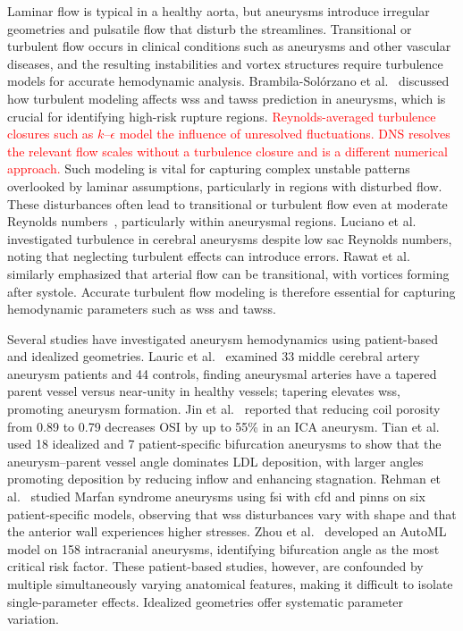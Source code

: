 \documentclass[12pt,a4paper]{article}
\newcommand{\cfdrevision}[1]{\textcolor{red}{#1}}
\newcommand{\CFD}{\ac{cfd}\xspace}
\newcommand{\FSI}{\ac{fsi}\xspace}
\newcommand{\PINNs}{\acp{pinn}\xspace}
\newcommand{\WSS}{\ac{wss}\xspace}
\newcommand{\TAWSS}{\ac{tawss}\xspace}
\newcommand{\OSI}{\ac{OSI}\xspace}
\newcommand{\ICA}{\ac{ICA}\xspace}
\newcommand{\DNS}{\ac{DNS}\xspace}
\newcommand{\LDL}{\ac{LDL}\xspace}
\theoremstyle{definition}
\numberwithin{equation}{section}
\begin{document}
Laminar flow is typical in a healthy aorta, but aneurysms introduce irregular geometries and pulsatile flow that disturb the streamlines. Transitional or turbulent flow occurs in clinical conditions such as aneurysms and other vascular diseases, and the resulting instabilities and vortex structures require turbulence models for accurate hemodynamic analysis. Brambila-Solórzano et al.~\cite{brambila2023influence} discussed how turbulent modeling affects \WSS and \TAWSS prediction in aneurysms, which is crucial for identifying high-risk rupture regions. \cfdrevision{Reynolds-averaged turbulence closures such as $k$--$\epsilon$ model the influence of unresolved fluctuations. \DNS resolves the relevant flow scales without a turbulence closure and is a different numerical approach.} Such modeling is vital for capturing complex unstable patterns overlooked by laminar assumptions, particularly in regions with disturbed flow. These disturbances often lead to transitional or turbulent flow even at moderate Reynolds numbers~\cite{evju2015assumption}, particularly within aneurysmal regions. Luciano et al.~\cite{luciano2024turbulent} investigated turbulence in cerebral aneurysms despite low sac Reynolds numbers, noting that neglecting turbulent effects can introduce errors. Rawat et al.~\cite{rawat2019numerical} similarly emphasized that arterial flow can be transitional, with vortices forming after systole. Accurate turbulent flow modeling is therefore essential for capturing hemodynamic parameters such as \WSS and \TAWSS.

Several studies have investigated aneurysm hemodynamics using patient-based and idealized geometries. Lauric et al.~\cite{lauric2019proximal} examined 33 middle cerebral artery aneurysm patients and 44 controls, finding aneurysmal arteries have a tapered parent vessel versus near-unity in healthy vessels; tapering elevates \WSS, promoting aneurysm formation. Jin et al.~\cite{jin2023cfd} reported that reducing coil porosity from 0.89 to 0.79 decreases \OSI by up to 55\% in an \ICA aneurysm. Tian et al.~\cite{tian2023influence} used 18 idealized and 7 patient-specific bifurcation aneurysms to show that the aneurysm--parent vessel angle dominates \LDL deposition, with larger angles promoting deposition by reducing inflow and enhancing stagnation. Rehman et al.~\cite{ur2025fluid} studied Marfan syndrome aneurysms using \FSI with \CFD and \PINNs on six patient-specific models, observing that \WSS disturbances vary with shape and that the anterior wall experiences higher stresses. Zhou et al.~\cite{zhou2026morphological} developed an AutoML model on 158 intracranial aneurysms, identifying bifurcation angle as the most critical risk factor. These patient-based studies, however, are confounded by multiple simultaneously varying anatomical features, making it difficult to isolate single-parameter effects. Idealized geometries offer systematic parameter variation.
\end{document}
